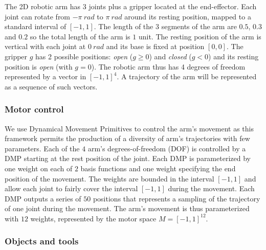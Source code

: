 \documentclass[10pt,letterpaper]{article}
\begin{document}
			The 2D robotic arm has $3$ joints plus a gripper located at the end-effector.
			Each joint can rotate from $-\pi~rad$ to $\pi~rad$ around its resting position, mapped to a standard interval of $[-1,1]$.
			The length of the $3$ segments of the arm are $0.5$, $0.3$ and $0.2$ so the total length of the arm is $1$ unit.
			The resting position of the arm is vertical with each joint at $0~rad$ and its base is fixed at position $[0, 0]$.
			The gripper $g$ has 2 possible positions: \textit{open} ($g \geq 0$) and \textit{closed} ($g < 0$) and its resting position is \textit{open} (with $g = 0$).
			The robotic arm thus has 4 degrees of freedom represented by a vector in $[-1,1]^4$.
			A trajectory of the arm will be represented as a sequence of such vectors.
		
		
		\subsubsection{Motor control}
		
			We use Dynamical Movement Primitives \cite{ijspeert_dynamical_2013} to control the arm's movement as this framework permits the production of a diversity of arm's trajectories with few parameters.
			Each of the $4$ arm's degrees-of-freedom (DOF) is controlled by a DMP starting at the rest position of the joint.
			Each DMP is parameterized by one weight on each of $2$ basis functions and one weight specifying the end position of the movement.
			The weights are bounded in the interval $[-1,1]$ and allow each joint to fairly cover the interval $[-1,1]$ during the movement.
			Each DMP outputs a series of $50$ positions that represents a sampling of the trajectory of one joint during the movement.		
			The arm's movement is thus parameterized with $12$ weights, represented by the motor space $M=[-1,1]^{12}$.\\
		
			
		\subsubsection{Objects and tools}
			
\end{document}

